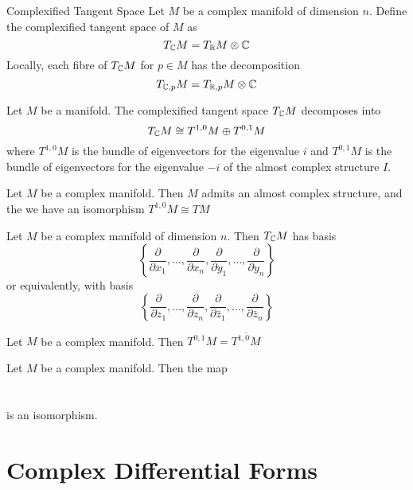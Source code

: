 \documentclass[a4paper]{article}
\begin{document}
\begin{defn}{Complexified Tangent Space}{} Let $M$ be a complex manifold of dimension $n$. Define the complexified tangent space of $M$ as $$T_{\mathbb{C}}M=T_{\mathbb{R}}M\otimes \mathbb{C}$$ Locally, each fibre of $T_{\mathbb{C}}M$ for $p\in M$ has the decomposition $$T_{\mathbb{C},p}M=T_{\mathbb{R},p}M\otimes\mathbb{C}$$
\end{defn}

\begin{prp}{}{} Let $M$ be a manifold. The complexified tangent space $T_{\mathbb{C}}M$ decomposes into $$T_{\mathbb{C}}M\cong T^{1,0}M\oplus T^{0,1}M$$ where $T^{1,0}M$ is the bundle of eigenvectors for the eigenvalue $i$ and $T^{0,1}M$ is the bundle of eigenvectors for the eigenvalue $-i$ of the almost complex structure $I$. 
\end{prp}

\begin{prp}{}{} Let $M$ be a complex manifold. Then $M$ admits an almost complex structure, and the we have an isomorphism $T^{1,0}M\cong TM$
\end{prp}

\begin{prp}{}{} Let $M$ be a complex manifold of dimension $n$. Then $T_{\mathbb{C}}M$ has basis $$\left\{\frac{\partial}{\partial x_1},\dots,\frac{\partial}{\partial x_n},\frac{\partial}{\partial y_1},\dots,\frac{\partial}{\partial y_n}\right\}$$ or equivalently, with basis $$\left\{\frac{\partial}{\partial z_1},\dots,\frac{\partial}{\partial z_n},\frac{\partial}{\partial \bar{z}_1},\dots,\frac{\partial}{\partial \bar{z}_n}\right\}$$
\end{prp}

\begin{prp}{}{} Let $M$ be a complex manifold. Then $T^{0,1}M=\overline{T^{1,0}M}$
\end{prp}

\begin{lmm}{}{} Let $M$ be a complex manifold. Then the map \\~\\
 \\
is an isomorphism. 
\end{lmm}

\pagebreak
\section{Complex Differential Forms}
\end{document}

